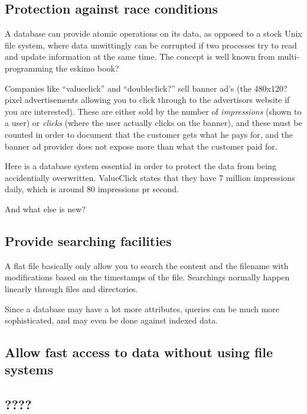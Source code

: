 \documentclass[ddraft,a4paper]{article}
\begin{document}
\subsection{Protection against race conditions}
\label{sec:protection-against-race-conditions}

A database can provide atomic operations on its data, as opposed to a
stock Unix file system, where data unwittingly can be corrupted if two
processes try to read and update information at the same time.  The
concept is well known from multi-programming \textsf{the eskimo book?}

Companies like ``valueclick'' and ``\textsf{doubleclick?}'' sell
banner ad's (the \textsf{480x120?} pixel advertisements allowing you
to click through to the advertisors website if you are interested).
These are either sold by the number of \textit{impressions} (shown to a
user) or \textit{clicks} (where the user actually clicks on the
banner), and these must be counted in order to document that the
customer gets what he pays for, and the banner ad provider does not
expose more than what the customer paid for.

Here is a database system essential in order to protect the data from
being accidentially overwritten.  ValueClick states that they have
\textsf{7 million impressions}  daily, which is around 80
impressions pr second.

\textsf{And what else is new?}

\subsection{Provide searching facilities}
\label{sec:providing-searching-facilities}

A flat file basically only allow you to search the content and the
filename with modifications based on the timestamps of the file.
Searchings normally happen linearly through files and directories.

Since a database may have a lot more attributes, queries can be much
more sophisticated, and may even be done against indexed data.

\subsection{Allow fast access to data without using file systems}
\label{sec:allow-fast-access-to-data}



\subsection{????}
\end{document}
